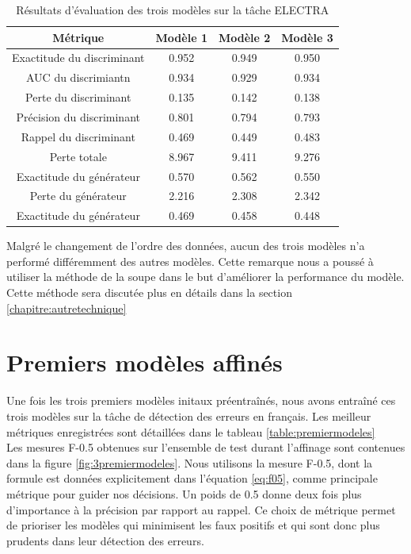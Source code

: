 \documentclass[12pt,twoside,maitrise]{dms}
\theoremstyle{definition}
\numberwithin{equation}{section}
\numberwithin{table}{chapter}
\numberwithin{figure}{chapter}
\begin{document}
\begin{table}[h!]
	\centering
	\begin{tabular}{||c | c c c||}
		\hline
		Métrique                   & Modèle 1 & Modèle 2 & Modèle 3 \\ [0.5ex]
		\hline\hline
		Exactitude du discriminant & 0.952    & 0.949    & 0.950    \\
		AUC du discrimiantn        & 0.934    & 0.929    & 0.934    \\
		Perte du discriminant      & 0.135    & 0.142    & 0.138    \\
		Précision du discriminant  & 0.801    & 0.794    & 0.793    \\
		Rappel du discriminant     & 0.469    & 0.449    & 0.483    \\
		Perte totale               & 8.967    & 9.411    & 9.276    \\
		Exactitude du générateur   & 0.570    & 0.562    & 0.550    \\
		Perte du générateur        & 2.216    & 2.308    & 2.342    \\
		Exactitude du générateur   & 0.469    & 0.458    & 0.448    \\
		\hline
	\end{tabular}
	\caption{Résultats d'évaluation des trois modèles sur la tâche ELECTRA}
	\label{table:respreentrainementsanscasse}
\end{table}
Malgré le changement de l'ordre des données, aucun des trois modèles n'a
performé différemment des autres modèles. Cette remarque nous a poussé à
utiliser la méthode de la soupe \cite{soup} dans le but d'améliorer la
performance du modèle. Cette méthode sera discutée plus en détails dans la
section \ref{chapitre:autretechnique}


\section{Premiers modèles affinés}\label{section:premiersmodelesaffines}
Une fois les trois premiers modèles initaux préentraînés, nous avons entraîné
ces trois modèles sur la tâche de détection des erreurs en français. Les
meilleur métriques enregistrées sont détaillées dans le tableau
\ref{table:premiermodeles} \\

Les mesures F-0.5 obtenues sur l'ensemble de test durant l'affinage sont
contenues dans la figure \ref{fig:3premiermodeles}. Nous utilisons la mesure
F-0.5, dont la formule est données explicitement dans l'équation \ref{eq:f05},
comme principale métrique pour guider nos décisions. Un poids de 0.5 donne deux
fois plus d'importance à la précision par rapport au rappel. Ce choix de
métrique permet de prioriser les modèles qui minimisent les faux positifs et
qui sont donc plus prudents dans leur détection des erreurs.
\end{document}
